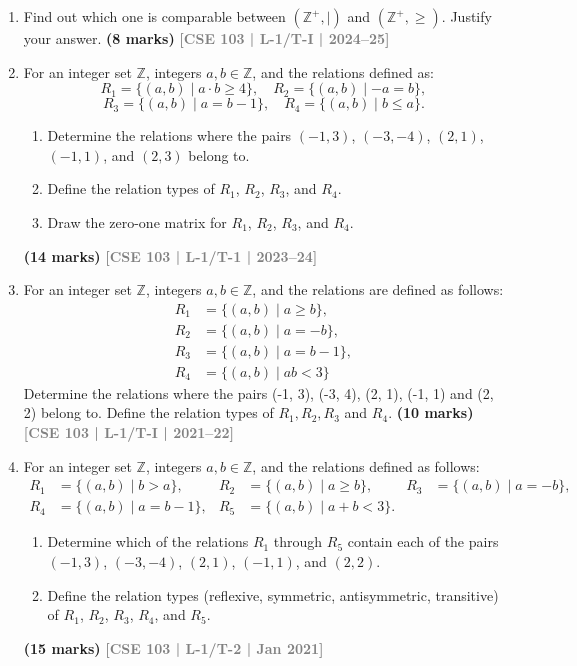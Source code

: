 \documentclass[12pt,a3paper]{article}
\newcommand{\yr}[1]{\hfill\textcolor{gray}{\small\textbf{[#1]}}}
\newcommand{\mk}[1]{\textcolor{orange!70!black}{\small\textbf{(#1 marks)}}}
\begin{document}
\begin{enumerate}

\item Find out which one is comparable between $(\mathbb{Z}^+, \mid)$ and $(\mathbb{Z}^+, \ge)$. Justify your answer.
\mk{8} \yr{CSE 103 | L-1/T-I | 2024--25}

\item For an integer set $\mathbb{Z}$, integers $a, b \in \mathbb{Z}$, and the relations defined as:
\[
  R_1 = \{(a,b) \mid a \cdot b \geq 4\}, \quad R_2 = \{(a,b) \mid -a = b\},
\]
\[
  R_3 = \{(a,b) \mid a = b-1\}, \quad R_4 = \{(a,b) \mid b \leq a\} .
\]
\begin{enumerate}
  \item Determine the relations where the pairs $(-1, 3)$, $(-3, -4)$, $(2, 1)$, $(-1, 1)$, and $(2, 3)$ belong to.
  \item Define the relation types of $R_1$, $R_2$, $R_3$, and $R_4$.
  \item Draw the zero-one matrix for $R_1$, $R_2$, $R_3$, and $R_4$. 
\end{enumerate}
\mk{14} \yr{CSE 103 | L-1/T-1 | 2023--24}

\item For an integer set $\mathbb{Z}$, integers $a, b \in \mathbb{Z}$, and the relations are defined as follows:
\begin{align*}
    R_1 &= \{(a,b) \mid a \ge b\}, \\
    R_2 &= \{(a,b) \mid a = -b\}, \\
    R_3 &= \{(a,b) \mid a = b-1\}, \\
    R_4 &= \{(a,b) \mid ab < 3\}
\end{align*}
Determine the relations where the pairs (-1, 3), (-3, 4), (2, 1), (-1, 1) and (2, 2) belong to. Define the relation types of $R_1, R_2, R_3$ and $R_4$.
\mk{10} \yr{CSE 103 | L-1/T-I | 2021--22}

\item For an integer set $\mathbb{Z}$, integers $a, b \in \mathbb{Z}$, and the relations defined as follows:
\begin{align*}
  R_1 &= \{(a,b) \mid b > a\}, &
  R_2 &= \{(a,b) \mid a \geq b\}, &
  R_3 &= \{(a,b) \mid a = -b\},\\
  R_4 &= \{(a,b) \mid a = b-1\}, &
  R_5 &= \{(a,b) \mid a + b < 3\}.
\end{align*}
\begin{enumerate}
  \item Determine which of the relations $R_1$ through $R_5$ contain each of the pairs $(-1,3)$, $(-3,-4)$, $(2,1)$, $(-1,1)$, and $(2,2)$.
  \item Define the relation types (reflexive, symmetric, antisymmetric, transitive) of $R_1$, $R_2$, $R_3$, $R_4$, and $R_5$.
\end{enumerate}
\mk{15} \yr{CSE 103 | L-1/T-2 | Jan 2021}  



\end{enumerate}
\end{document}

